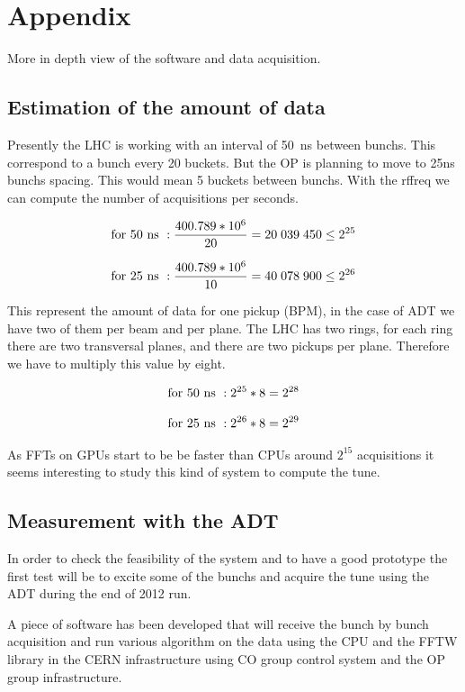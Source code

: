 %

\chapter{Appendix}

More in depth view of the software and data acquisition.

\section{Estimation of the amount of data}

Presently the \gls{LHC} is working with an interval of 50~ns between \glspl{bunch}. This correspond to a bunch every 20 \glspl{bucket}. But the \gls{OP} is planning to move to 25ns \glspl{bunch} spacing. This would mean 5 \glspl{bucket} between \glspl{bunch}. With the \gls{rffreq} we can compute the number of acquisitions per seconds.

$${\rm for~}50{\rm ~ns}~: \frac{400.789*10^{6}}{20} = 20\;039\;450 \leq 2^{25}$$

$${\rm for~}25{\rm ~ns}~: \frac{400.789*10^{6}}{10} = 40\;078\;900 \leq 2^{26}$$ 

This represent the amount of data for one pickup (\gls{BPM}), in the case of \gls{ADT} we have two of them per beam and per plane. The \gls{LHC} has two rings, for each ring there are two transversal planes, and there are two pickups per plane. Therefore we have to multiply this value by eight.

$${\rm for~}50{\rm ~ns}~: 2^{25} * 8 = 2^{28}$$

$${\rm for~}25{\rm ~ns}~: 2^{26} * 8 = 2^{29}$$

As \glspl{FFT} on \glspl{GPU} start to be be faster than \glspl{CPU} around $2^{15}$ acquisitions it seems interesting to study this kind of system to compute the \gls{tune}.

\section{Measurement with the ADT}

In order to check the feasibility of the system and to have a good prototype the first test will be to excite some of the \glspl{bunch} and acquire the \gls{tune} using the \gls{ADT} during the end of 2012 run\cite{Valuch12}.

A piece of software has been developed that will receive the bunch by bunch acquisition and run various algorithm on the data using the \gls{CPU} and the \gls{FFTW} library in the \gls{CERN} infrastructure using \gls{CO} group control system and the \gls{OP} group infrastructure.

